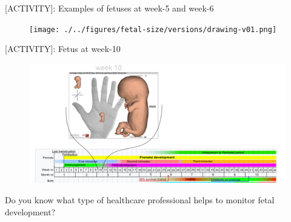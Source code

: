 {
\begin{frame}{[\faUsers ACTIVITY]: Examples of fetuses at week-5 and week-6}
      \begin{figure}
        \centering
        \texttt{[image: ./../figures/fetal-size/versions/drawing-v01.png]}
      \end{figure}
\end{frame}
}


{
\begin{frame}{[\faUsers ACTIVITY]: Fetus at week-10}
      \begin{figure}
        \centering
        \includegraphics[width=1.0\textwidth]{./../figures/fetal-size/versions/drawing-v02.png}
      \end{figure}
\end{frame}
}



{
\begin{frame}{}

\BigSizeFont
\begin{center}
    Do you know what type of healthcare professional helps to monitor fetal development?
\end{center}

\end{frame}
}


